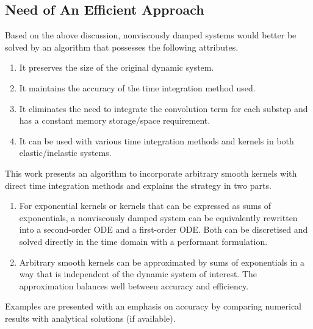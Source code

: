 \subsection{Need of An Efficient Approach}
Based on the above discussion, nonviscously damped systems would better be solved by an algorithm that possesses the following attributes.
\begin{Objective}
\begin{enumerate}
\item It preserves the size of the original dynamic system.
\item It maintains the accuracy of the time integration method used.
\item It eliminates the need to integrate the convolution term for each substep and has a constant memory storage/space requirement.
\item It can be used with various time integration methods and kernels in both elastic/inelastic systems.
\end{enumerate}
\end{Objective}

This work presents an algorithm to incorporate arbitrary smooth kernels with direct time integration methods and explains the strategy in two parts.
\begin{enumerate}
\item For exponential kernels or kernels that can be expressed as sums of exponentials, a nonviscously damped system can be equivalently rewritten into a second-order ODE and a first-order ODE. Both can be discretised and solved directly in the time domain with a performant formulation. 
\item Arbitrary smooth kernels can be approximated by sums of exponentials in a way that is independent of the dynamic system of interest. The approximation balances well between accuracy and efficiency. 
\end{enumerate}
Examples are presented  with an emphasis on accuracy by comparing numerical results with analytical solutions (if available).

